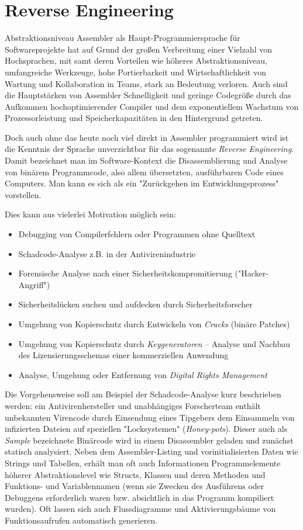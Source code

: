 \section{Reverse Engineering}
Abstraktionsniveau
Assembler als Haupt-Programmiersprache für Softwareprojekte hat auf Grund der großen Verbreitung einer Vielzahl von Hochsprachen, mit samt deren Vorteilen wie höheres Abstraktionsniveau, umfangreiche Werkzeuge, hohe Portierbarkeit und Wirtschaftlichkeit von Wartung und Kollaboration in Teams, stark an Bedeutung verloren. Auch sind die Hauptstärken von Assembler Schnelligkeit und geringe Codegröße durch das Aufkommen hochoptimierender Compiler und dem exponentiellem Wachstum von Prozessorleistung und Speicherkapazitäten in den Hintergrund getreten.

Doch auch ohne das heute noch viel direkt in Assembler programmiert wird ist die Kenntnis der Sprache unverzichtbar für das sogenannte \emph{Reverse Engineering}. Damit bezeichnet man im Software-Kontext die Disassemblierung und Analyse von binärem Programmcode, also allem übersetzten, ausführbaren Code eines Computers. Man kann es sich als ein "Zurückgehen im Entwicklungsprozess" vorstellen.\cite{Warden1992}

Dies kann aus vielerlei Motivation möglich sein:
\begin{itemize}
\item Debugging von Compilerfehlern oder Programmen ohne Quelltext
\item Schadcode-Analyse z.B. in der Antivirenindustrie
\item Forensische Analyse nach einer Sicherheitskompromitierung ("Hacker-Angriff")
\item Sicherheitslücken suchen und aufdecken durch Sicherheitsforscher
\item Umgehung von Kopierschutz durch Entwickeln von \emph{Cracks} (binäre Patches)
\item Umgehung von Kopierschutz durch \emph{Keygeneratoren} – Analyse und Nachbau des Lizensierungsschemas einer kommerziellen Anwendung
\item Analyse, Umgehung oder Entfernung von \emph{Digital Rights Management}
\end{itemize}

Die Vorgehensweise soll am Beispiel der Schadcode-Analyse kurz beschrieben werden: ein Antivirenhersteller und unabhängiges Forscherteam enthält unbekannten Virencode durch Einsendung eines Tipgebers dem Einsammeln von infizierten Dateien auf speziellen "Locksystemen" (\emph{Honey-pots}). Dieser auch als \emph{Sample} bezeichnete Binärcode wird in einem Disassembler geladen und zunächst statisch analysiert. Neben dem Assembler-Listing und vorinitialisierten Daten wie Strings und Tabellen, erhält man oft auch Informationen Programmelemente höherer Abstraktionslevel wie Structs, Klassen und deren Methoden und Funktions- und Variablennamen (wenn sie Zwecken des Ausführens oder Debuggens erforderlich waren bzw. absichtlich in das Programm kompiliert wurden).
Oft lassen sich auch Flussdiagramme und Aktivierungsbäume von Funktionsaufrufen automatisch generieren.

